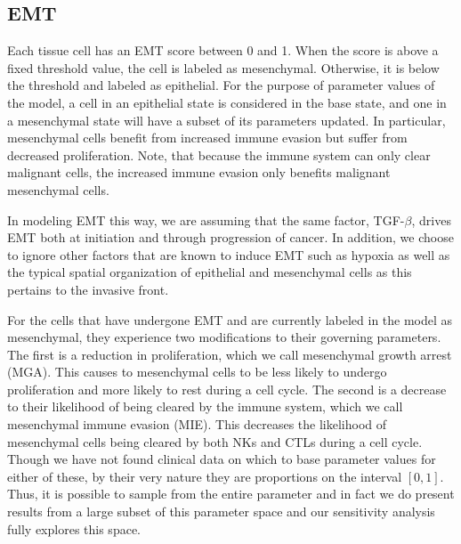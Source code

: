 \documentclass[11pt]{article}
\begin{document}
\subsection{EMT}\label{EMT}
Each tissue cell has an EMT score between 0 and 1.
When the score is above a fixed threshold value, the cell is labeled as mesenchymal.
Otherwise, it is below the threshold and labeled as epithelial.
For the purpose of parameter values of the model, a cell in an epithelial state is considered in the base state, and one in a mesenchymal state will have a subset of its parameters updated.
In particular, mesenchymal cells benefit from increased immune evasion but suffer from decreased proliferation.
Note, that because the immune system can only clear malignant cells, the increased immune evasion only benefits malignant mesenchymal cells.
\par
In modeling EMT this way, we are assuming that the same factor, TGF-$\beta$, drives EMT both at initiation and through progression of cancer.
In addition, we choose to ignore other factors that are known to induce EMT such as hypoxia as well as the typical spatial organization of epithelial and mesenchymal cells as this pertains to the invasive front.
\par
For the cells that have undergone EMT and are currently labeled in the model as mesenchymal, they experience two modifications to their governing parameters.
The first is a reduction in proliferation, which we call mesenchymal growth arrest (MGA).
This causes to mesenchymal cells to be less likely to undergo proliferation and more likely to rest during a cell cycle.
The second is a decrease to their likelihood of being cleared by the immune system, which we call mesenchymal immune evasion (MIE). 
This decreases the likelihood of mesenchymal cells being cleared by both NKs and CTLs during a cell cycle.
Though we have not found clinical data on which to base parameter values for either of these, by their very nature they are proportions on the interval $[0,1]$.
Thus, it is possible to sample from the entire parameter and in fact we do present results from a large subset of this parameter space and our sensitivity analysis fully explores this space.
\end{document}
